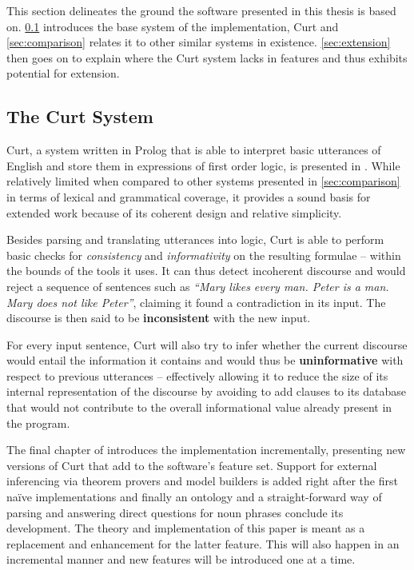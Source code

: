 \documentclass[11pt,a4paper]{article}
\newcommand{\term}[1]{\textsf{\textbf{#1}}} %
\newcommand{\pn}{\textsf} %
\newcommand{\curt}{\pn{Curt}}
\newcommand{\prol}{\pn{Prolog}}
\theoremstyle{remark}
\theoremstyle{remark}
\theoremstyle{definition}
\begin{document}
This section delineates the ground the software presented in this thesis is
based on. \ref{sec:curt} introduces the base system of the implementation, \curt
and \ref{sec:comparison} relates it to other similar systems in existence.
\ref{sec:extension} then goes on to explain where the \curt{} system lacks in
features and thus exhibits potential for extension.

\subsection{The Curt System} \label{sec:curt}

\curt, a system written in \prol{} that is able to interpret basic utterances
of English and store them in expressions of first order logic, is
presented in \cite[chapter 6]{blackburnbos:cl1}. While relatively limited when
compared to other systems presented in \ref{sec:comparison} in terms of lexical
and grammatical coverage, it provides a sound basis for extended work because of
its coherent design and relative simplicity.

Besides parsing and translating utterances into logic, \curt{} is able to perform
basic checks for \emph{consistency} and \emph{informativity} on the resulting
formulae -- within the bounds of the tools it uses.
It can thus detect incoherent discourse and would reject a sequence of
sentences such as \emph{``Mary likes every man. Peter is a man. Mary does not
like Peter''}, claiming it found a contradiction in its input. The discourse is
then said to be \term{inconsistent} with the new input.

For every input
sentence, \curt{} will also try to infer whether the current discourse would
entail the information it contains and would thus be \term{uninformative} with
respect to previous utterances – effectively allowing it to
reduce the size of its internal representation of the discourse by avoiding to
add clauses to its database that would not contribute to the overall informational value
already present in the program.

The final chapter of \cite{blackburnbos:cl1} introduces the implementation
incrementally, presenting new versions of \curt{} that add to the software's
feature set. Support for external inferencing via theorem provers and model
builders is added right after the first naïve implementations and
finally an ontology and a straight-forward way of parsing and answering direct
questions for noun phrases conclude its development. The theory and
implementation of this paper is meant as a replacement and enhancement for the
latter feature. This will also happen in an incremental manner and new features
will be introduced one at a time.
\end{document}
